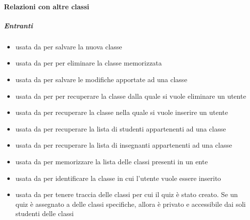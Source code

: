 \paragraph{Relazioni con altre classi}
\subparagraph{Entranti}
\begin{itemize}
\item usata da  per salvare la nuova classe
\item usata da  per per eliminare la classe memorizzata
\item usata da  per salvare le modifiche apportate ad una classe
\item usata da  per per recuperare la classe dalla quale si vuole eliminare un utente
\item usata da  per recuperare la classe nella quale si vuole inserire un utente
\item usata da  per recuperare la lista di studenti appartenenti ad una classe
\item usata da  per recuperare la lista di insegnanti appartenenti ad una classe
\item usata da  per memorizzare la lista
delle classi presenti in un ente
\item usata da  per identificare la classe
in cui l'utente vuole essere inserito
\item usata da  per tenere traccia delle classi per
cui il quiz è stato creato. Se un quiz è assegnato a delle classi specifiche, allora è privato e
accessibile dai soli studenti delle classi
\end{itemize}
